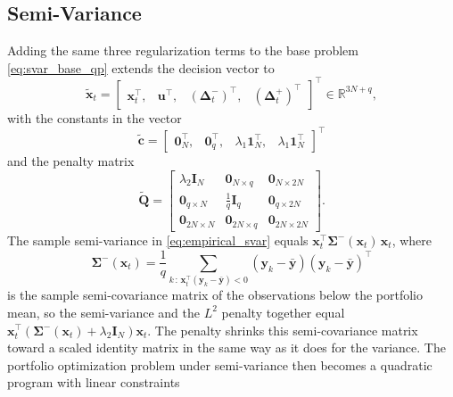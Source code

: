 \subsection{Semi-Variance} \label{app:mv_svar_reg}

Adding the same three regularization terms to the base problem \eqref{eq:svar_base_qp} extends the decision vector to
\begin{equation*}
    \tilde{\bm{x}}_t = \begin{bmatrix} \bm{x}_t^\top,& \bm{u}^\top,& (\bm{\Delta}_t^-)^\top,& (\bm{\Delta}_t^+)^\top \end{bmatrix}^\top
    \in \mathbb{R}^{3N+q},
\end{equation*}
with the constants in the vector
\begin{equation*}
    \tilde{\bm{c}} = \begin{bmatrix} \bm{0}_N^\top,& \bm{0}_q^\top,& \lambda_1 \bm{1}_N^\top,& \lambda_1 \bm{1}_N^\top \end{bmatrix}^\top
\end{equation*}
and the penalty matrix
\begin{equation*}
    \tilde{\bm{Q}} =
    \begin{bmatrix}
        \lambda_2 \bm{I}_N & \bm{0}_{N \times q} & \bm{0}_{N \times 2N} \\
        \bm{0}_{q \times N} & \tfrac{1}{q} \bm{I}_q & \bm{0}_{q \times 2N} \\
        \bm{0}_{2N \times N} & \bm{0}_{2N \times q} & \bm{0}_{2N \times 2N}
    \end{bmatrix}.
\end{equation*}
The sample semi-variance in \eqref{eq:empirical_svar} equals $\bm{x}_t^\top \bm{\Sigma}^-(\bm{x}_t)\, \bm{x}_t$, where
\begin{equation*}
    \bm{\Sigma}^-(\bm{x}_t) = \frac{1}{q} \sum_{k \,:\, \bm{x}_t^\top (\bm{y}_k - \bar{\bm{y}}) < 0}
    (\bm{y}_k - \bar{\bm{y}})(\bm{y}_k - \bar{\bm{y}})^\top
\end{equation*}
is the sample semi-covariance matrix of the observations below the portfolio mean, so the semi-variance and the $L^2$
penalty together equal $\bm{x}_t^\top (\bm{\Sigma}^-(\bm{x}_t) + \lambda_2 \bm{I}_N) \bm{x}_t$. The penalty shrinks this
semi-covariance matrix toward a scaled identity matrix in the same way as it does for the variance. 
The portfolio optimization problem under semi-variance
then becomes a quadratic program with linear constraints
